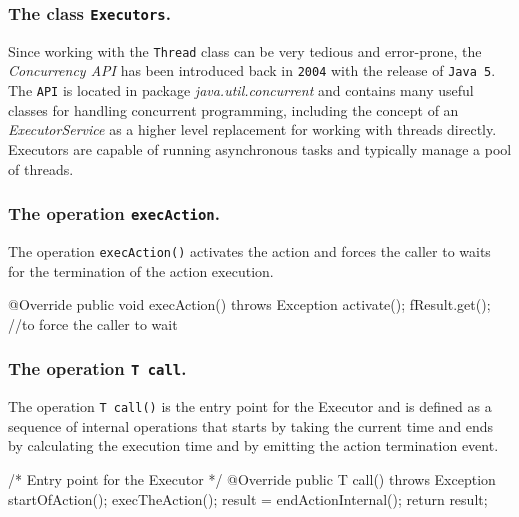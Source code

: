 \subsubsection{The class \texttt{Executors}.\\}

Since working with the \texttt{Thread} class can be very tedious and error-prone, the \textit{Concurrency API} has been introduced back in \texttt{2004} with the release of \texttt{Java 5}. The \texttt{API} is located in package \textit{java.util.concurrent} and contains many useful classes for handling concurrent programming, including the concept of an \textit{ExecutorService} as a higher level replacement for working with threads directly. Executors are capable of running asynchronous tasks and typically manage a pool of threads. 

\subsubsection{The operation \texttt{execAction}.\\}

The operation \texttt{execAction()} activates the action and forces the caller to waits for the termination of the action execution.

\begin{javacode}
	@Override
	public void execAction() throws Exception {
		activate();
		fResult.get();	//to force the caller to wait
	}
\end{javacode}



\subsubsection{The operation \texttt{T call}.\\}

The operation \texttt{T call()} is the entry point for the Executor and is defined as a sequence of internal operations that starts by taking the current time and ends by calculating the execution time and by emitting the action termination event.

\begin{javacode}
	/* Entry point for the Executor */
	@Override
	public T call() throws Exception {
		startOfAction(); 
		execTheAction();
		result = endActionInternal();
		return result;
	}
\end{javacode}

